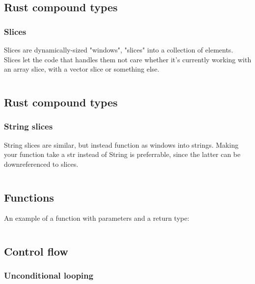 \documentclass[usenames,twocolumn,dvipsnames,10pt,a4wide]{article}
\begin{document}
\inputminted[fontsize=\normalsize]{rust}{code/array.rs}



\subsection{Rust compound types}
\subsubsection{Slices}
Slices are dynamically-sized "windows", "slices" into a
collection of elements. Slices let the code that handles
them not care whether it's currently working with an
array slice, with a vector slice or something else.

\inputminted[fontsize=\normalsize]{rust}{code/slice.rs}



\subsection{Rust compound types}
\subsubsection{String slices}
String slices are similar, but instead function as windows
into strings. Making your function take a str instead of 
String is preferrable, since the latter can be
downreferenced to slices.

\inputminted[fontsize=\normalsize]{rust}{code/str.rs}



\subsection{Functions}
\large
An example of a function with parameters and a return type:

\inputminted[fontsize=\normalsize]{rust}{code/function.rs}



\subsection{Control flow}
	\subsubsection{Unconditional looping}
\inputminted[fontsize=\normalsize]{rust}{code/control1.rs}
\end{document}

